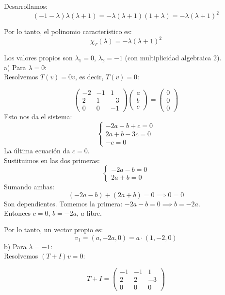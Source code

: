\documentclass{article}
\theoremstyle{nonumberplain}
\begin{document}
Desarrollamos:
\[
(-1-\lambda)\lambda(\lambda+1) = -\lambda(\lambda+1)(1+\lambda) = -\lambda(\lambda+1)^2
\]

Por lo tanto, el polinomio característico es:
\[
\chi_T(\lambda) = -\lambda(\lambda+1)^2
\]

Los valores propios son \( \lambda_1 = 0 \), \( \lambda_2 = -1 \) (con multiplicidad algebraica 2).\\
a) Para \( \lambda = 0 \): \\

Resolvemos \( T(v) = 0v \), es decir, \( T(v) = 0 \):

\[
\begin{pmatrix}
-2 & -1 & 1 \\
2 & 1 & -3 \\
0 & 0 & -1
\end{pmatrix}
\begin{pmatrix}
a\\b\\c
\end{pmatrix}
= \begin{pmatrix}
0\\0\\0
\end{pmatrix}
\]
Esto nos da el sistema:
\[
\begin{cases}
-2a - b + c = 0 \\
2a + b - 3c = 0 \\
-c = 0
\end{cases}
\]
La última ecuación da \( c = 0 \).  \\
Sustituimos en las dos primeras:
\[
\begin{cases}
-2a - b = 0 \\
2a + b = 0
\end{cases}
\]
Sumando ambas:
\[
(-2a-b) + (2a+b) = 0 \implies 0 = 0
\]
Son dependientes. Tomemos la primera: \( -2a - b = 0 \implies b = -2a \).  \\
Entonces \( c = 0 \), \( b = -2a \), \( a \) libre.

Por lo tanto, un vector propio es:
\[
v_1 = (a, -2a, 0) = a \cdot (1, -2, 0)
\]
b) Para \( \lambda = -1 \):\\

Resolvemos \( (T + I)v = 0 \):

\[
T + I = \begin{pmatrix}
-1 & -1 & 1 \\
2 & 2 & -3 \\
0 & 0 & 0
\end{pmatrix}
\]
\end{document}
